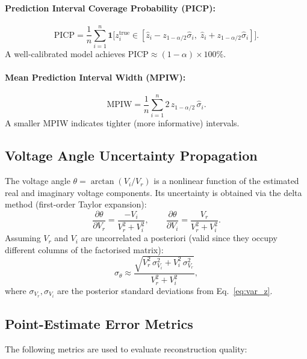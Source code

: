 \documentclass[11pt,a4paper]{article}
\begin{document}
\paragraph{Prediction Interval Coverage Probability (PICP):}
\begin{equation}
  \mathrm{PICP} = \frac{1}{n}\sum_{i=1}^{n} \mathbf{1}\!\bigl[z_i^{\text{true}} \in [\hat{z}_i - z_{1-\alpha/2}\hat{\sigma}_i,\; \hat{z}_i + z_{1-\alpha/2}\hat{\sigma}_i]\bigr].
\end{equation}
A well-calibrated model achieves $\mathrm{PICP} \approx (1-\alpha)\times 100\%$.

\paragraph{Mean Prediction Interval Width (MPIW):}
\begin{equation}
  \mathrm{MPIW} = \frac{1}{n}\sum_{i=1}^{n} 2\, z_{1-\alpha/2}\, \hat{\sigma}_i.
\end{equation}
A smaller MPIW indicates tighter (more informative) intervals.

\subsection{Voltage Angle Uncertainty Propagation}
The voltage angle $\theta = \arctan(V_i / V_r)$ is a nonlinear function of the estimated real and imaginary voltage components. Its uncertainty is obtained via the delta method (first-order Taylor expansion):
\begin{equation}
  \frac{\partial \theta}{\partial V_r} = \frac{-V_i}{V_r^2 + V_i^2}, \qquad
  \frac{\partial \theta}{\partial V_i} = \frac{V_r}{V_r^2 + V_i^2}.
\end{equation}
Assuming $V_r$ and $V_i$ are uncorrelated a posteriori (valid since they occupy different columns of the factorised matrix):
\begin{equation}\label{eq:angle_std}
  \sigma_\theta \approx \frac{\sqrt{V_r^{2}\,\sigma_{V_i}^{2} + V_i^{2}\,\sigma_{V_r}^{2}}}{V_r^{2} + V_i^{2}},
\end{equation}
where $\sigma_{V_r}, \sigma_{V_i}$ are the posterior standard deviations from Eq.~\eqref{eq:var_z}.

\subsection{Point-Estimate Error Metrics}
The following metrics are used to evaluate reconstruction quality:
\end{document}
